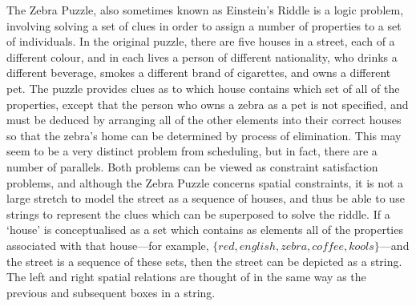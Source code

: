\documentclass[a4paper,12pt,leqno]{article}
\begin{document}
The Zebra Puzzle, also sometimes known as Einstein's Riddle is a logic problem, involving solving a set of clues in order to assign a number of properties to a set of individuals. In the original puzzle, there are five houses in a street, each of a different colour, and in each lives a person of different nationality, who drinks a different beverage, smokes a different brand of cigarettes, and owns a different pet. The puzzle provides clues as to which house contains which set of all of the properties, except that the person who owns a zebra as a pet is not specified, and must be deduced by arranging all of the other elements into their correct houses so that the zebra's home can be determined by process of elimination. This may seem to be a very distinct problem from scheduling, but in fact, there are a number of parallels. Both problems can be viewed as constraint satisfaction problems, and although the Zebra Puzzle concerns spatial constraints, it is not a large stretch to model the street as a sequence of houses, and thus be able to use strings to represent the clues which can be superposed to solve the riddle. If a `house' is conceptualised as a set which contains as elements all of the properties associated with that house---for example, $\{red, english, zebra, coffee, kools\}$---and the street is a sequence of these sets, then the street can be depicted as a string. The left and right spatial relations are thought of in the same way as the previous and subsequent boxes in a string.
\end{document}
